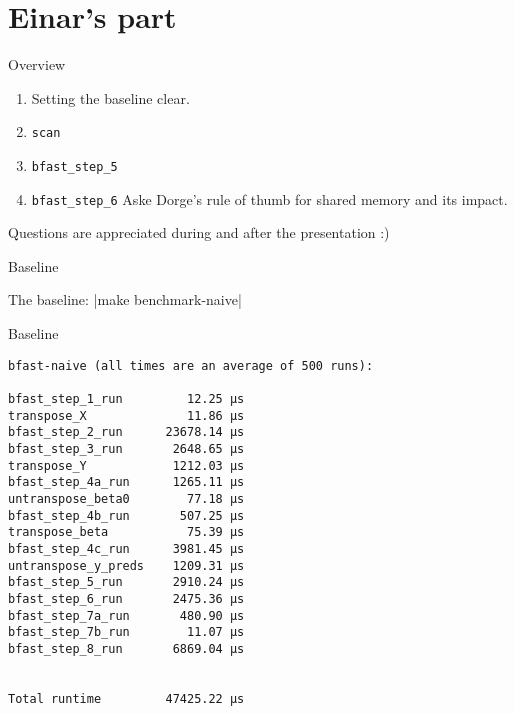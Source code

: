 \section{Einar's part}

\begin{frame}[fragile]{Overview}
\begin{enumerate}
    \item Setting the baseline clear.
    \item \texttt{scan}
    \item \texttt{bfast\_step\_5}
    \item \texttt{bfast\_step\_6} Aske Dorge's rule of thumb for shared
        memory and its impact.
\end{enumerate}
    \pause
Questions are appreciated during and after the presentation :)
\end{frame}


\begin{frame}[fragile]{Baseline}

The baseline: |make benchmark-naive|

\end{frame}

\begin{frame}[fragile]{Baseline}
    \centering
    \begin{verbatim}
bfast-naive (all times are an average of 500 runs):

bfast_step_1_run         12.25 µs
transpose_X              11.86 µs
bfast_step_2_run      23678.14 µs
bfast_step_3_run       2648.65 µs
transpose_Y            1212.03 µs
bfast_step_4a_run      1265.11 µs
untranspose_beta0        77.18 µs
bfast_step_4b_run       507.25 µs
transpose_beta           75.39 µs
bfast_step_4c_run      3981.45 µs
untranspose_y_preds    1209.31 µs
bfast_step_5_run       2910.24 µs
bfast_step_6_run       2475.36 µs
bfast_step_7a_run       480.90 µs
bfast_step_7b_run        11.07 µs
bfast_step_8_run       6869.04 µs


Total runtime         47425.22 µs
\end{verbatim}

\end{frame}

